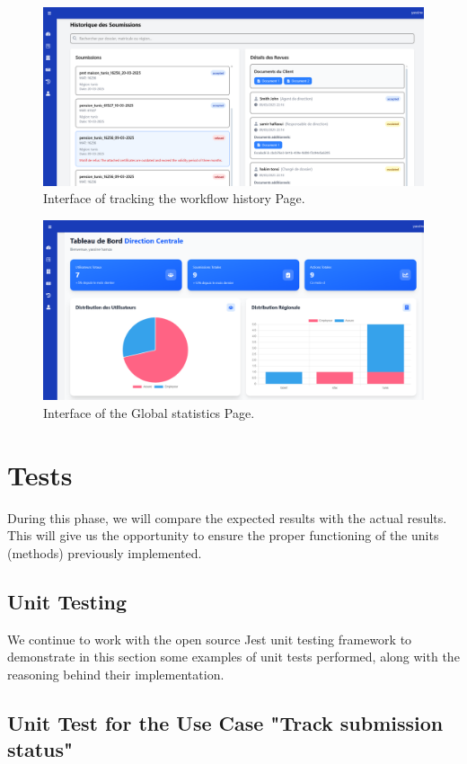 \begin{figure}[h!]
    \centering
    \includegraphics[width=1\textwidth]{figures/ui-track workflow history.png}
    \caption{Interface of tracking the workflow history Page.}
\end{figure}
\begin{figure}[h!]
    \centering
    \includegraphics[width=1\textwidth]{figures/ui-consult global stat.png}
    \caption{Interface of the Global statistics Page.}
\end{figure}
\clearpage
\section{Tests}
During this phase, we will compare the expected results with the actual results.
This will give us the opportunity to ensure the proper functioning of the units (methods) previously implemented.
\subsection{Unit Testing}
We continue to work with the open source Jest unit testing framework to demonstrate in this section some examples of unit tests performed, along with the reasoning behind their implementation.

\subsection{ Unit Test for the Use Case "Track submission status"}
